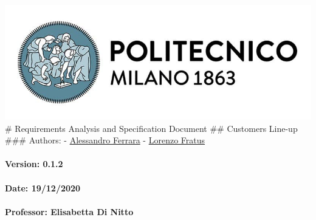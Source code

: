 \documentclass[
]{article}
\author{}
\date{}
\begin{document}
\includegraphics{assets//polimi_logo.jpg} \# Requirements Analysis and
Specification Document \#\# Customers Line-up \#\#\# Authors: -
\href{https://github.com/ferrohd}{Alessandro Ferrara} -
\href{https://github.com/lorenzofratus}{Lorenzo Fratus}

\hypertarget{version-0.1.2}{%
\paragraph{\texorpdfstring{Version: 0.1.2
}{Version: 0.1.2 }}\label{version-0.1.2}}

\hypertarget{date-19122020}{%
\paragraph{\texorpdfstring{Date: 19/12/2020
}{Date: 19/12/2020 }}\label{date-19122020}}

\hypertarget{professor-elisabetta-di-nitto}{%
\paragraph{\texorpdfstring{Professor: Elisabetta Di Nitto
}{Professor: Elisabetta Di Nitto }}\label{professor-elisabetta-di-nitto}}
\end{document}
